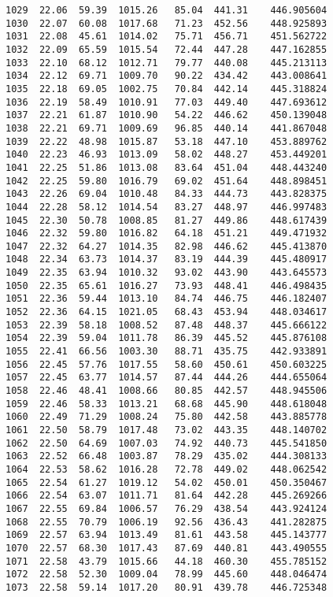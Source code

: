 \documentclass[11pt]{article}
\begin{document}
\begin{tcolorbox}[breakable, size=fbox, boxrule=.5pt, pad at break*=1mm, opacityfill=0]
\begin{Verbatim}[commandchars=\\\{\}]
1029  22.06  59.39  1015.26   85.04  441.31    446.905604
1030  22.07  60.08  1017.68   71.23  452.56    448.925893
1031  22.08  45.61  1014.02   75.71  456.71    451.562722
1032  22.09  65.59  1015.54   72.44  447.28    447.162855
1033  22.10  68.12  1012.71   79.77  440.08    445.213113
1034  22.12  69.71  1009.70   90.22  434.42    443.008641
1035  22.18  69.05  1002.75   70.84  442.14    445.318824
1036  22.19  58.49  1010.91   77.03  449.40    447.693612
1037  22.21  61.87  1010.90   54.22  446.62    450.139048
1038  22.21  69.71  1009.69   96.85  440.14    441.867048
1039  22.22  48.98  1015.87   53.18  447.10    453.889762
1040  22.23  46.93  1013.09   58.02  448.27    453.449201
1041  22.25  51.86  1013.08   83.64  451.04    448.443240
1042  22.25  59.80  1016.79   69.02  451.64    448.898451
1043  22.26  69.04  1010.48   84.33  444.73    443.828375
1044  22.28  58.12  1014.54   83.27  448.97    446.997483
1045  22.30  50.78  1008.85   81.27  449.86    448.617439
1046  22.32  59.80  1016.82   64.18  451.21    449.471932
1047  22.32  64.27  1014.35   82.98  446.62    445.413870
1048  22.34  63.73  1014.37   83.19  444.39    445.480917
1049  22.35  63.94  1010.32   93.02  443.90    443.645573
1050  22.35  65.61  1016.27   73.93  448.41    446.498435
1051  22.36  59.44  1013.10   84.74  446.75    446.182407
1052  22.36  64.15  1021.05   68.43  453.94    448.034617
1053  22.39  58.18  1008.52   87.48  448.37    445.666122
1054  22.39  59.04  1011.78   86.39  445.52    445.876108
1055  22.41  66.56  1003.30   88.71  435.75    442.933891
1056  22.45  57.76  1017.55   58.60  450.61    450.603225
1057  22.45  63.77  1014.57   87.44  444.26    444.655064
1058  22.46  48.41  1008.66   80.85  442.57    448.945506
1059  22.46  58.33  1013.21   68.68  445.90    448.618048
1060  22.49  71.29  1008.24   75.80  442.58    443.885778
1061  22.50  58.79  1017.48   73.02  443.35    448.140702
1062  22.50  64.69  1007.03   74.92  440.73    445.541850
1063  22.52  66.48  1003.87   78.29  435.02    444.308133
1064  22.53  58.62  1016.28   72.78  449.02    448.062542
1065  22.54  61.27  1019.12   54.02  450.01    450.350467
1066  22.54  63.07  1011.71   81.64  442.28    445.269266
1067  22.55  69.84  1006.57   76.29  438.54    443.924124
1068  22.55  70.79  1006.19   92.56  436.43    441.282875
1069  22.57  63.94  1013.49   81.61  443.58    445.143777
1070  22.57  68.30  1017.43   87.69  440.81    443.490555
1071  22.58  43.79  1015.66   44.18  460.30    455.785152
1072  22.58  52.30  1009.04   78.99  445.60    448.046474
1073  22.58  59.14  1017.20   80.91  439.78    446.725348

\end{Verbatim}
\end{tcolorbox}
\end{document}
